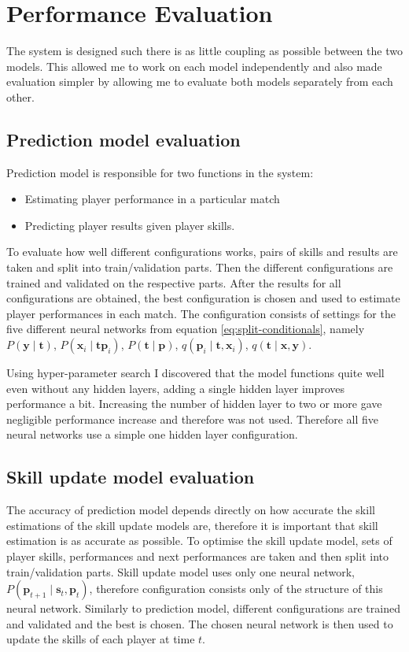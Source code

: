 \documentclass[12pt,a4paper]{book}
\newcommand\bs[1]{\boldsymbol{#1}}
\begin{document}
\section{Performance Evaluation}
The system is designed such there is as little coupling as possible between the two models.
This allowed me to work on each model independently and also made evaluation simpler by allowing me to evaluate both models separately from each other.
\subsection{Prediction model evaluation}
Prediction model is responsible for two functions in the system:
\begin{itemize}
\item Estimating player performance in a particular match
\item Predicting player results given player skills.
\end{itemize}

To evaluate how well different configurations works, pairs of skills and results are taken and split into train/validation parts.
Then the different configurations are trained and validated on the respective parts.
After the results for all configurations are obtained, the best configuration is chosen and used to estimate player performances in each match.
The configuration consists of settings for the five different neural networks from equation \ref{eq:split-conditionals}, namely 
$P(\bs{y}\mid\bs{t})$, $P(\bs{x}_i \mid \bs{t} \bs{p}_i)$, $P(\bs{t} \mid \bs{p})$, $q(\bs{p}_i \mid \bs{t},\bs{x}_i)$, $q(\bs{t}\mid\bs{x},\bs{y})$.

Using hyper-parameter search I discovered that the model functions quite well even without any hidden layers, adding a single hidden layer improves performance a bit.
Increasing the number of hidden layer to two or more gave negligible performance increase and therefore was not used.
Therefore all five neural networks use a simple one hidden layer configuration.
\subsection{Skill update model evaluation}
The accuracy of prediction model depends directly on how accurate the skill estimations of the skill update models are, therefore it is important that skill estimation is as accurate as possible.
To optimise the skill update model, sets of player skills, performances and next performances are taken and then split into train/validation parts.
Skill update model uses only one neural network, $P(\bs{p}_{t+1}\mid\bs{s}_t,\bs{p}_t)$, therefore configuration consists only of the structure of this neural network.
Similarly to prediction model, different configurations are trained and validated and the best is chosen.
The chosen neural network is then used to update the skills of each player at time $t$.
\end{document}
